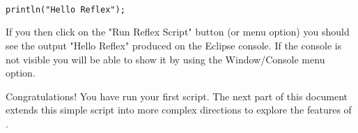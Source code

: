 \begin{verbatim}

println("Hello Reflex");

\end{verbatim}

If you then click on the "Run Reflex Script" button (or menu option) you should see the output "Hello Reflex" produced on the Eclipse console. If the console is not visible you will be able to show it by using the Window/Console menu option.

Congratulations! You have run your first \Reflex script. The next part of this document extends this simple script into more complex directions to explore the features of \Reflex.
